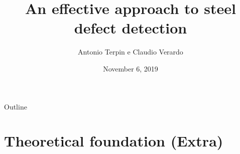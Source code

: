 \documentclass[usenames,dvipsnames,xcolor=table]{beamer}
\title[Steel defect detection]{An effective approach to steel defect detection}
\date[November 6, 2019]{November 6, 2019}
\author[Antonio Terpin e Claudio Verardo]{
  Antonio Terpin e Claudio Verardo
}
\institute{Scuola Superiore, University of Udine}
\begin{document}
\begin{frame}
\titlepage
\end{frame}

\begin{frame}{Outline}
\tableofcontents
\end{frame}





\section{Theoretical foundation (Extra)}









\end{document}
